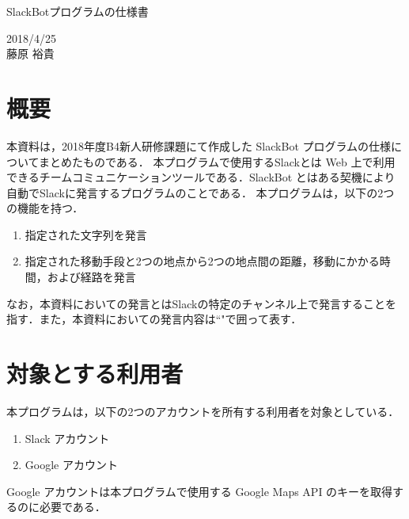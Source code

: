 \documentclass[12pt]{jsarticle}
\begin{document}
\begin{center}
{\LARGE SlackBotプログラムの仕様書}
\end{center}

\begin{flushright}
  2018/4/25\\
  藤原 裕貴
\end{flushright}
\section{概要}
\label{sec:introduction}
本資料は，2018年度B4新人研修課題にて作成した SlackBot プログラムの仕様についてまとめたものである．
本プログラムで使用するSlack\cite{Slack}とは Web 上で利用できるチームコミュニケーションツールである．SlackBot とはある契機により自動でSlackに発言するプログラムのことである．
本プログラムは，以下の2つの機能を持つ．
\begin{enumerate}
\item 指定された文字列を発言
\item 指定された移動手段と2つの地点から2つの地点間の距離，移動にかかる時間，および経路を発言
\end{enumerate}
なお，本資料においての発言とはSlackの特定のチャンネル上で発言することを指す．また，本資料においての発言内容は``"で囲って表す．

\section{対象とする利用者}\label{sec:user}
本プログラムは，以下の2つのアカウントを所有する利用者を対象としている．
\begin{enumerate}
\item Slack アカウント
\item Google アカウント

\end{enumerate}

Google アカウントは本プログラムで使用する Google Maps API のキーを取得するのに必要である．
\end{document}
